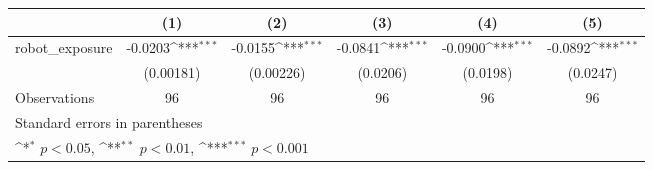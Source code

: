 {
\def\sym#1{\ifmmode^{#1}\else\(^{#1}\)\fi}
\begin{tabular}{l*{5}{c}}
\toprule
                    &\multicolumn{1}{c}{(1)}         &\multicolumn{1}{c}{(2)}         &\multicolumn{1}{c}{(3)}         &\multicolumn{1}{c}{(4)}         &\multicolumn{1}{c}{(5)}         \\
\midrule
robot\_exposure      &     -0.0203\sym{***}&     -0.0155\sym{***}&     -0.0841\sym{***}&     -0.0900\sym{***}&     -0.0892\sym{***}\\
                    &   (0.00181)         &   (0.00226)         &    (0.0206)         &    (0.0198)         &    (0.0247)         \\
\midrule
Observations        &          96         &          96         &          96         &          96         &          96         \\
\bottomrule
\multicolumn{6}{l}{\footnotesize Standard errors in parentheses}\\
\multicolumn{6}{l}{\footnotesize \sym{*} \(p<0.05\), \sym{**} \(p<0.01\), \sym{***} \(p<0.001\)}\\
\end{tabular}
}
